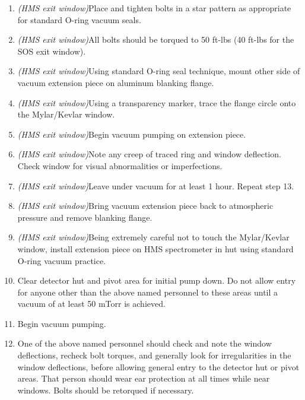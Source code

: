 \begin{enumerate}
\item{{\sl (HMS exit window)}Place and tighten bolts in a star pattern as appropriate for
standard O-ring vacuum seals.}

\item{{\sl (HMS exit window)}All bolts should be torqued to 50 ft-lbs (40 ft-lbs for the SOS
exit window).}

\item{{\sl (HMS exit window)}Using standard O-ring seal technique, mount other side of
vacuum extension piece on aluminum blanking flange.}

\item{{\sl (HMS exit window)}Using a transparency marker, trace the flange circle onto the
Mylar/Kevlar window.}

\item{{\sl (HMS exit window)}Begin vacuum pumping on extension
piece.} 

\item{{\sl (HMS exit window)}Note any creep of traced ring and window
deflection.  Check window for visual abnormalities or imperfections.}

\item{{\sl (HMS exit window)}Leave under vacuum for at least 1 hour.
Repeat step 13.}

\item{{\sl (HMS exit window)}Bring vacuum extension piece back to
atmospheric pressure and remove blanking flange.}

\item{{\sl (HMS exit window)}Being extremely careful not to touch the
Mylar/Kevlar window, install extension piece on HMS spectrometer in
hut using standard O-ring vacuum practice.}

\item{Clear detector hut and pivot area for initial pump down. Do not
allow entry for anyone other than the above named personnel to
these areas until a vacuum of at least 50 mTorr is achieved.}

\item{Begin vacuum pumping.}

\item{One of the above named personnel should check and note the
window deflections, recheck bolt torques, and generally look for
irregularities in the window deflections, before allowing
general entry to the detector
hut or pivot areas. That person should wear ear protection at all times while
near windows. Bolts should be retorqued if necessary.}


\end{enumerate}
